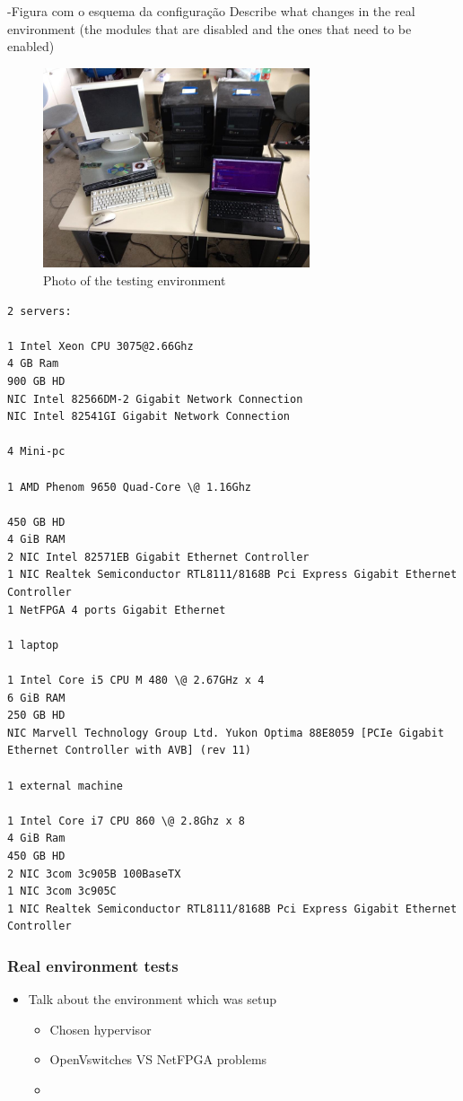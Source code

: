 \documentclass[12pt,english,oneside]{book}
\begin{document}
-Figura com o esquema da configuração
Describe what changes in the real environment (the modules that are disabled and the ones that need to be enabled)

\begin{figure}[htbp]
        \centering
        \includegraphics[width=0.7\textwidth]{figures/realenvironment.jpg}
        \caption{Photo of the testing environment}
        \label{fig:realenv}
\end{figure}

\begin{verbatim}
2 servers:

1 Intel Xeon CPU 3075@2.66Ghz
4 GB Ram
900 GB HD
NIC Intel 82566DM-2 Gigabit Network Connection
NIC Intel 82541GI Gigabit Network Connection

4 Mini-pc

1 AMD Phenom 9650 Quad-Core \@ 1.16Ghz

450 GB HD
4 GiB RAM
2 NIC Intel 82571EB Gigabit Ethernet Controller
1 NIC Realtek Semiconductor RTL8111/8168B Pci Express Gigabit Ethernet Controller
1 NetFPGA 4 ports Gigabit Ethernet

1 laptop

1 Intel Core i5 CPU M 480 \@ 2.67GHz x 4 
6 GiB RAM
250 GB HD
NIC Marvell Technology Group Ltd. Yukon Optima 88E8059 [PCIe Gigabit Ethernet Controller with AVB] (rev 11)

1 external machine

1 Intel Core i7 CPU 860 \@ 2.8Ghz x 8 
4 GiB Ram
450 GB HD
2 NIC 3com 3c905B 100BaseTX
1 NIC 3com 3c905C
1 NIC Realtek Semiconductor RTL8111/8168B Pci Express Gigabit Ethernet Controller

\end{verbatim}

\subsubsection{Real environment tests}
\begin{itemize}
  \item Talk about the environment which was setup
  \begin{itemize}
    \item Chosen hypervisor
    \item OpenVswitches VS NetFPGA problems
    \item 
  \end{itemize}
\end{itemize}
\end{document}
